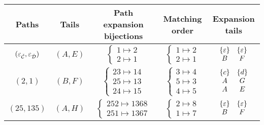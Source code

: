 \begin{tabular}{c|c|c|c|c}
Paths & Tails & Path expansion bijections & Matching order & Expansion tails\\
\hline
$(\varepsilon_{\check{\mathcal{C}}},\varepsilon_{\check{\mathcal{D}}})$ & $(A,E)$ & $\begin{cases} 1 \mapsto 2 \\ 2 \mapsto 1\end{cases}$ & $\begin{cases}1 \mapsto 2\\2 \mapsto 1\end{cases}$ & 
$\begin{array}{cc}
    \left\{\varepsilon\right\} & \left\{\varepsilon\right\} \\
    B & F
\end{array}$\\
\hline
$(2,1)$ & $(B,F)$ & $\begin{cases} 23 \mapsto 14 \\ 25 \mapsto 13\\24 \mapsto 15\end{cases}$ & $\begin{cases}3 \mapsto 4\\5 \mapsto 3\\4\mapsto 5\end{cases}$ & $\begin{array}{cc} \left\{c\right\} & \left\{d\right\} \\ A & G \\ A & E\end{array}$\\
\hline
$(25,135)$ & $(A,H)$ & $\begin{cases} 252 \mapsto 1368 \\ 251 \mapsto 1367\end{cases}$ & $\begin{cases}2 \mapsto 8\\1 \mapsto 7\end{cases}$ & $\begin{array}{cc} \left\{\varepsilon\right\} & \left\{\varepsilon\right\}\\ B & F \end{array}$\\
\end{tabular}